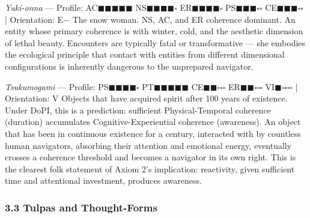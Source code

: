 \textit{Yuki-onna} — Profile: AC$\blacksquare$$\blacksquare$$\blacksquare$$\blacksquare$$\blacksquare$ NS$\blacksquare$$\blacksquare$$\blacksquare$$\blacksquare$$\square$ ER$\blacksquare$$\blacksquare$$\blacksquare$$\blacksquare$$\square$ PS$\blacksquare$$\blacksquare$$\blacksquare$$\square$$\square$ CE$\blacksquare$$\blacksquare$$\blacksquare$$\square$$\square$ | Orientation: E− The snow woman. NS, AC, and ER coherence dominant. An entity whose primary coherence is with winter, cold, and the aesthetic dimension of lethal beauty. Encounters are typically fatal or transformative — she embodies the ecological principle that contact with entities from different dimensional configurations is inherently dangerous to the unprepared navigator.


\textit{Tsukumogami} — Profile: PS$\blacksquare$$\blacksquare$$\blacksquare$$\blacksquare$$\square$ PT$\blacksquare$$\blacksquare$$\blacksquare$$\blacksquare$$\blacksquare$ CE$\blacksquare$$\blacksquare$$\square$$\square$$\square$ ER$\blacksquare$$\blacksquare$$\square$$\square$$\square$ VI$\blacksquare$$\square$$\square$$\square$$\square$ | Orientation: V Objects that have acquired spirit after 100 years of existence. Under DoPI, this is a prediction: sufficient Physical-Temporal coherence (duration) accumulates Cognitive-Experiential coherence (awareness). An object that has been in continuous existence for a century, interacted with by countless human navigators, absorbing their attention and emotional energy, eventually crosses a coherence threshold and becomes a navigator in its own right. This is the clearest folk statement of Axiom 2's implication: reactivity, given sufficient time and attentional investment, produces awareness.


\subsubsection*{3.3 Tulpas and Thought-Forms}

